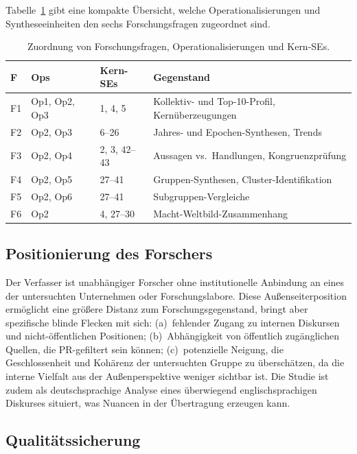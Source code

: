 \documentclass[12pt,a4paper]{article}
\begin{document}
Tabelle~\ref{tab:zuordnung} gibt eine kompakte \"Ubersicht, welche Operationalisierungen und Syntheseeinheiten den sechs Forschungsfragen zugeordnet sind.

\begin{table}[htbp]
  \centering
  \caption{Zuordnung von Forschungsfragen, Operationalisierungen und Kern-SEs.}
  \label{tab:zuordnung}
  \footnotesize
  \begin{tabularx}{\textwidth}{l l l X}
    \toprule
    \textbf{F} & \textbf{Ops} & \textbf{Kern-SEs} & \textbf{Gegenstand} \\
    \midrule
    F1 & Op1, Op2, Op3 & 1, 4, 5 & Kollektiv- und Top-10-Profil, Kern\"uberzeugungen \\
    F2 & Op2, Op3 & 6--26 & Jahres- und Epochen-Synthesen, Trends \\
    F3 & Op2, Op4 & 2, 3, 42--43 & Aussagen vs.\ Handlungen, Kongruenzpr\"ufung \\
    F4 & Op2, Op5 & 27--41 & Gruppen-Synthesen, Cluster-Identifikation \\
    F5 & Op2, Op6 & 27--41 & Subgruppen-Vergleiche \\
    F6 & Op2 & 4, 27--30 & Macht-Weltbild-Zusammenhang \\
    \bottomrule
  \end{tabularx}
\end{table}


\subsection{Positionierung des Forschers}
\label{sec:methodik:positionierung}

Der Verfasser ist unabh\"angiger Forscher ohne institutionelle Anbindung an eines der untersuchten Unternehmen oder Forschungslabore. Diese Au\ss{}enseiterposition erm\"oglicht eine gr\"o\ss{}ere Distanz zum Forschungsgegenstand, bringt aber spezifische blinde Flecken mit sich: (a)~fehlender Zugang zu internen Diskursen und nicht-\"offentlichen Positionen; (b)~Abh\"angigkeit von \"offentlich zug\"anglichen Quellen, die PR-gefiltert sein k\"onnen; (c)~potenzielle Neigung, die Geschlossenheit und Koh\"arenz der untersuchten Gruppe zu \"ubersch\"atzen, da die interne Vielfalt aus der Au\ss{}enperspektive weniger sichtbar ist. Die Studie ist zudem als deutschsprachige Analyse eines \"uberwiegend englischsprachigen Diskurses situiert, was Nuancen in der \"Ubertragung erzeugen kann.

\subsection{Qualit\"atssicherung}
\label{sec:methodik:qualitaet}
\end{document}
